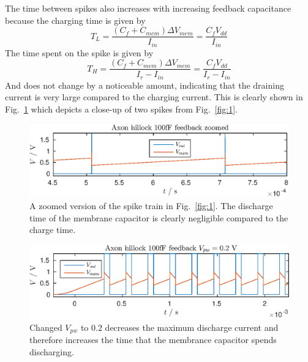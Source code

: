The time between spikes also increases with increasing feedback capacitance because the charging time is given by
\begin{equation*}
    T_L = \frac{(C_f+C_{mem})\Delta V_{mem}}{I_{in}} = \frac{C_fV_{dd}}{I_{in}}
\end{equation*}
The time spent on the spike is given by
\begin{equation*}
    T_H = \frac{(C_f+C_{mem})\Delta V_{mem}}{I_r-I_{in}} = \frac{C_fV_{dd}}{I_r-I_{in}}
\end{equation*}
And does not change by a noticeable amount, indicating that the draining current is very large compared to the charging current.
This is clearly shown in Fig.~\ref{fig:zoomed} which depicts a close-up of two spikes from Fig.~\ref{fig:1}.
\begin{figure}
    \center
    \includegraphics{fig_zoom.eps}
    \caption{A zoomed version of the spike train in Fig.~\ref{fig:1}. The discharge time of the membrane capacitor is clearly negligible compared to the charge time.}
    \label{fig:zoomed}
\end{figure}
\begin{figure}
    \center
    \includegraphics{fig5.eps}
    \caption{Changed \(V_{pw}\) to \(0.2\) decreases the maximum discharge current and therefore increases the time that the membrance capacitor spends discharging.}
    \label{fig:5}
\end{figure}
